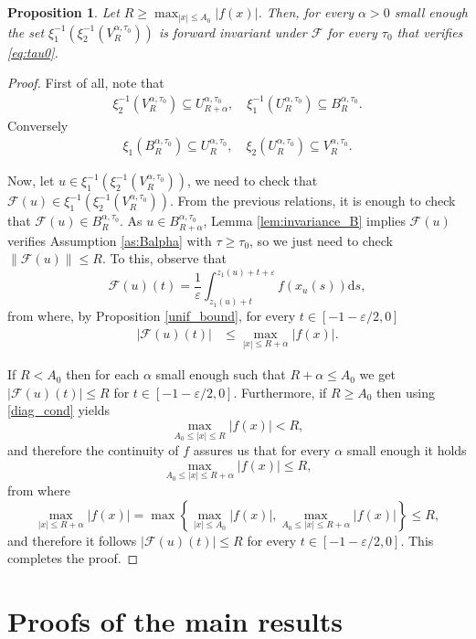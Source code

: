 \documentclass[a4paper,11pt]{article}
\theoremstyle{plain}
\newtheorem{prop}[thm]{Proposition}
\theoremstyle{definition}
\theoremstyle{definition}
\newcommand{\Fcal}{\mathcal{F}}
\newcommand{\dd}{\mathrm{d}}
\numberwithin{equation}{section}
\begin{document}
\begin{prop}\label{prop:invariance}
Let $R\geq \max_{|x|\leq A_0}|f(x)|$. Then, for every $\alpha>0$ small enough the set $\xi_1^{-1}(\xi_2^{-1}(V^{\alpha,\tau_0}_R))$ is forward invariant under $\Fcal$ for every $\tau_0$ that verifies \eqref{eq:tau0}.
\end{prop}
\begin{proof}
First of all, note that
\begin{align*}
    \xi_2^{-1}(V^{\alpha,\tau_0}_R) \subseteq U^{\alpha,\tau_0}_{R+\alpha},\quad
    \xi_1^{-1}(U^{\alpha,\tau_0}_R) \subseteq B^{\alpha,\tau_0}_R.
\end{align*}
Conversely
\begin{align*}
    \xi_1(B^{\alpha,\tau_0}_R) \subseteq U^{\alpha,\tau_0}_R, \quad
    \xi_2(U^{\alpha,\tau_0}_R)\subseteq V^{\alpha,\tau_0}_R.
\end{align*}

Now, let $u\in \xi_1^{-1}(\xi_2^{-1}(V^{\alpha,\tau_0}_R))$, we need to check that $\Fcal(u)\in \xi_1^{-1}(\xi_2^{-1}(V^{\alpha,\tau_0}_R))$. From the previous relations, it is enough to check that $\Fcal(u)\in B^{\alpha,\tau_0}_R$. As $u\in B^{\alpha,\tau_0}_{R+\alpha}$, Lemma \ref{lem:invariance_B} implies $\Fcal(u)$ verifies Assumption \ref{as:Balpha} with $\tau \geq \tau_0$, so we just need to check $\|\Fcal(u)\|\leq R$. To this, observe that
\[
    \Fcal(u)(t) = \frac{1}{\varepsilon}\int_{z_1(u)+t}^{z_1(u)+t+\varepsilon} f(x_u(s))\dd s,
\]
from where, by Proposition \ref{unif_bound}, for every $t\in[-1-\varepsilon/2,0]$
\begin{align*}
    |\Fcal(u)(t)| &\leq \max_{|x|\leq R+\alpha} |f(x)|.
\end{align*}

If $R<A_0$ then for each $\alpha$ small enough such that $R + \alpha\leq A_0$ we get $|\Fcal(u)(t)|\leq R$ for $t\in[-1-\varepsilon/2,0]$. Furthermore, if $R\geq A_0$ then using \eqref{diag_cond} yields
\[
    \max_{A_0\leq |x|\leq R} |f(x)| < R,
\]
and therefore the continuity of $f$ assures us that for every $\alpha$ small enough it holds
\[
    \max_{A_0\leq |x|\leq R+\alpha} |f(x)| \leq R,
\]
from where
\[
    \max_{|x|\leq R+ \alpha} |f(x)| = \max\left\{ \max_{|x|\leq A_0} |f(x)| , \max_{A_0\leq|x|\leq R+\alpha} |f(x)| \right\} \leq R,
\]
and therefore it follows $|\Fcal(u)(t)|\leq R$ for every $t\in[-1-\varepsilon/2,0]$. This completes the proof.
\end{proof}

\section{Proofs of the main results}\label{sec:proofs}
\end{document}
